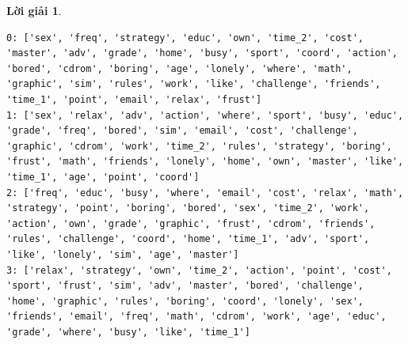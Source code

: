 \documentclass[14pt, a4paper]{article}
\theoremstyle{sltheorem}
\theoremstyle{soltheorem}
\newtheorem*{loigiai}{Lời giải}
\begin{document}
\begin{loigiai}
    \begin{verbatim}
0: ['sex', 'freq', 'strategy', 'educ', 'own', 'time_2', 'cost', 'master', 'adv', 'grade', 'home', 'busy', 'sport', 'coord', 'action', 'bored', 'cdrom', 'boring', 'age', 'lonely', 'where', 'math', 'graphic', 'sim', 'rules', 'work', 'like', 'challenge', 'friends', 'time_1', 'point', 'email', 'relax', 'frust']
1: ['sex', 'relax', 'adv', 'action', 'where', 'sport', 'busy', 'educ', 'grade', 'freq', 'bored', 'sim', 'email', 'cost', 'challenge', 'graphic', 'cdrom', 'work', 'time_2', 'rules', 'strategy', 'boring', 'frust', 'math', 'friends', 'lonely', 'home', 'own', 'master', 'like', 'time_1', 'age', 'point', 'coord']
2: ['freq', 'educ', 'busy', 'where', 'email', 'cost', 'relax', 'math', 'strategy', 'point', 'boring', 'bored', 'sex', 'time_2', 'work', 'action', 'own', 'grade', 'graphic', 'frust', 'cdrom', 'friends', 'rules', 'challenge', 'coord', 'home', 'time_1', 'adv', 'sport', 'like', 'lonely', 'sim', 'age', 'master']
3: ['relax', 'strategy', 'own', 'time_2', 'action', 'point', 'cost', 'sport', 'frust', 'sim', 'adv', 'master', 'bored', 'challenge', 'home', 'graphic', 'rules', 'boring', 'coord', 'lonely', 'sex', 'friends', 'email', 'freq', 'math', 'cdrom', 'work', 'age', 'educ', 'grade', 'where', 'busy', 'like', 'time_1']
    \end{verbatim}
\end{loigiai}

\newpage
\printbibliography[title={TÀI LIỆU THAM KHẢO}]
\end{document}
